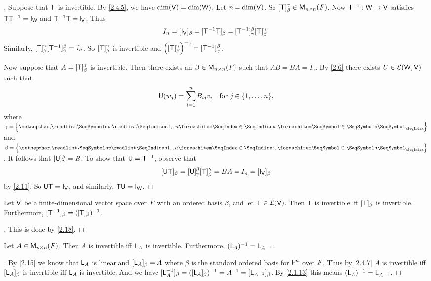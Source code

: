 \begin{proof}[]
  Suppose that \(\mathsf{T}\) is invertible.
  By \cref{2.4.5}, we have \(\dim(\mathsf{V}) = \dim(\mathsf{W})\).
  Let \(n = \dim(\mathsf{V})\).
  So \([\mathsf{T}]_{\beta}^{\gamma} \in \mathsf{M}_{{n} \times n}({\mathit{F}})\).
  Now \(\mathsf{T}^{-1} : \mathsf{W} \to \mathsf{V}\) satisfies \(\T \T^{-1} = \IT[\W]\) and \(\T^{-1} \T = \IT[\V]\).
  Thus
  \[
    I_n = [\IT[\V]]_{\beta} = [\T^{-1} \T]_{\beta} = [\T^{-1}]_{\gamma}^{\beta} [\T]_{\beta}^{\gamma}.
  \]
  Similarly, \([\mathsf{T}]_{\beta}^{\gamma} [\mathsf{T}^{-1}]_{\gamma}^{\beta} = I_n\).
  So \([\mathsf{T}]_{\beta}^{\gamma}\) is invertible and \(\left\lparen[\mathsf{T}]_{\beta}^{\gamma}\right\rparen^{-1} = [\mathsf{T}^{-1}]_{\gamma}^{\beta}\).

  Now suppose that \(A = [\mathsf{T}]_{\beta}^{\gamma}\) is invertible.
  Then there exists an \(B \in \mathsf{M}_{{n} \times n}({\mathit{F}})\) such that \(AB = BA = I_n\).
  By \cref{2.6} there exists \(U \in \mathcal{L}(\mathsf{W}, \mathsf{V})\) such that
  \[
    \U(w_j) = \sum_{i = 1}^n B_{i j} v_i \quad \text{for } j \in \set{1, \dots, n},
  \]
  where \(\gamma = \set{\seq{w}{1,,n}}\) and \(\beta = \set{\seq{v}{1,,n}}\).
  It follows that \([\mathsf{U}]_{\gamma}^{\beta} = B\).
  To show that \(\mathsf{U} = \mathsf{T}^{-1}\), observe that
  \[
    [\U \T]_{\beta} = [\U]_{\gamma}^{\beta} [\T]_{\beta}^{\gamma} = BA = I_n = [\IT[\V]]_{\beta}
  \]
  by \cref{2.11}.
  So \(\U \T = \IT[\V]\), and similarly, \(\T \U = \IT[\W]\).
\end{proof}

\begin{cor}\label{2.4.6}
  Let \(\mathsf{V}\) be a finite-dimensional vector space over \(\mathit{F}\) with an ordered basis \(\beta\), and let \(\mathsf{T} \in \mathcal{L}(\mathsf{V})\).
  Then \(\mathsf{T}\) is invertible iff \([\mathsf{T}]_{\beta}\) is invertible.
  Furthermore, \([\mathsf{T}^{-1}]_{\beta} = ([\mathsf{T}]_{\beta})^{-1}\).
\end{cor}

\begin{proof}[]
  This is done by \cref{2.18}.
\end{proof}

\begin{cor}\label{2.4.7}
  Let \(A \in \mathsf{M}_{{n} \times n}({\mathit{F}})\).
  Then \(A\) is invertible iff \(\mathsf{L}_A\) is invertible.
  Furthermore, \((\mathsf{L}_A)^{-1} = \mathsf{L}_{A^{-1}}\).
\end{cor}

\begin{proof}[]
  By \cref{2.15} we know that \(\mathsf{L}_A\) is linear and \([\mathsf{L}_A]_{\beta} = A\) where \(\beta\) is the standard ordered basis for \(\mathsf{F}^n\) over \(\mathit{F}\).
  Thus by \cref{2.4.7} \(A\) is invertible iff \([\mathsf{L}_A]_{\beta}\) is invertible iff \(\mathsf{L}_A\) is invertible.
  And we have \([\mathsf{L}_A^{-1}]_{\beta} = ([\mathsf{L}_A]_{\beta})^{-1} = A^{-1} = [\mathsf{L}_{A^{-1}}]_{\beta}\).
  By \cref{2.1.13} this means \((\mathsf{L}_A)^{-1} = \mathsf{L}_{A^{-1}}\).
\end{proof}

